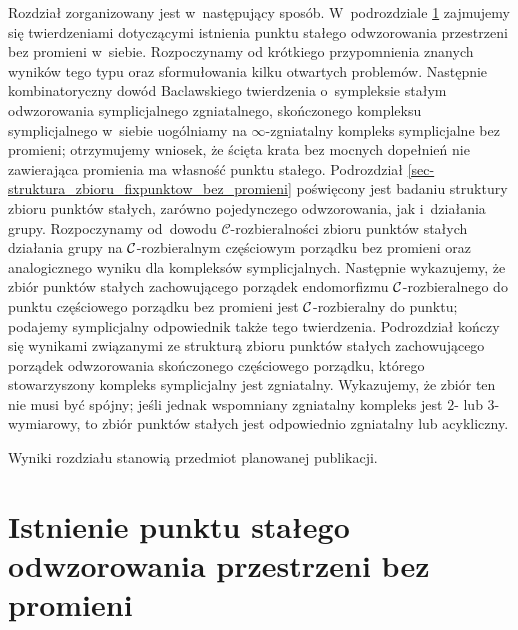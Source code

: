 Rozdział zorganizowany jest w~następujący sposób. W~podrozdziale \ref{sec-istnienie_fixpunktu_bez_promieni} zajmujemy się twierdzeniami dotyczącymi istnienia punktu stałego odwzorowania przestrzeni bez promieni w~siebie. Rozpoczynamy od krótkiego przypomnienia znanych wyników tego typu oraz sformułowania kilku otwartych problemów. Następnie kombinatoryczny dowód Baclawskiego \cite{Baclawski12} twierdzenia o~sympleksie stałym odwzorowania symplicjalnego zgniatalnego, skończonego kompleksu symplicjalnego w~siebie uogólniamy na $\infty$-zgniatalny kompleks symplicjalne bez promieni; otrzymujemy wniosek, że ścięta krata bez mocnych dopełnień nie zawierająca promienia ma własność punktu stałego. Podrozdział \ref{sec-struktura_zbioru_fixpunktow_bez_promieni} poświęcony jest badaniu struktury zbioru punktów stałych, zarówno pojedynczego odwzorowania, jak i~działania grupy. Rozpoczynamy od~dowodu \mbox{$\mathcal{C}$-rozbieralności} zbioru punktów stałych działania grupy na \mbox{$\mathcal{C}$-rozbieralnym} częściowym porządku bez promieni oraz analogicznego wyniku dla kompleksów symplicjalnych. Następnie wykazujemy, że zbiór punktów stałych zachowującego porządek endomorfizmu \mbox{$\mathcal{C}$-rozbieralnego} do punktu częściowego porządku bez promieni jest \mbox{$\mathcal{C}$-rozbieralny} do punktu; podajemy symplicjalny odpowiednik także tego twierdzenia. Podrozdział kończy się wynikami związanymi ze strukturą zbioru punktów stałych zachowującego porządek odwzorowania skończonego częściowego porządku, którego stowarzyszony kompleks symplicjalny jest zgniatalny. Wykazujemy, że zbiór ten nie musi być spójny; jeśli jednak wspomniany zgniatalny kompleks jest $2$- lub $3$-wymiarowy, to zbiór punktów stałych jest odpowiednio zgniatalny lub acykliczny.

Wyniki rozdziału stanowią przedmiot planowanej publikacji.




\section[Istnienie punktu stałego]{Istnienie punktu stałego odwzorowania przestrzeni bez promieni}\label{sec-istnienie_fixpunktu_bez_promieni}



